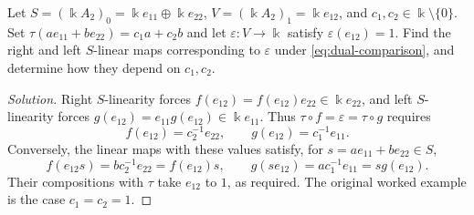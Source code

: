\begin{advanced}
\begin{exercise}\label{ex:dual-blocks}
Let $S=(\Bbbk A_2)_0=\Bbbk e_{11}\oplus\Bbbk e_{22}$, $V=(\Bbbk A_2)_1=\Bbbk e_{12}$, and $c_1,c_2\in\Bbbk\setminus\{0\}$.
Set $\tau(ae_{11}+be_{22})=c_1a+c_2b$ and let $\varepsilon:V\to\Bbbk$ satisfy $\varepsilon(e_{12})=1$.
Find the right and left $S$-linear maps corresponding to $\varepsilon$ under \eqref{eq:dual-comparison}, and determine how they depend on $c_1,c_2$.
\end{exercise}

\begin{hidden}
\begin{proof}[Solution]
Right $S$-linearity forces $f(e_{12})=f(e_{12})e_{22}\in\Bbbk e_{22}$, and left $S$-linearity forces $g(e_{12})=e_{11}g(e_{12})\in\Bbbk e_{11}$.
Thus $\tau\circ f=\varepsilon=\tau\circ g$ requires
\[
f(e_{12})=c_2^{-1}e_{22},\qquad g(e_{12})=c_1^{-1}e_{11}.
\]
Conversely, the linear maps with these values satisfy, for $s=ae_{11}+be_{22}\in S$,
\[
f(e_{12}s)=bc_2^{-1}e_{22}=f(e_{12})s,\qquad
g(se_{12})=ac_1^{-1}e_{11}=sg(e_{12}).
\]
Their compositions with $\tau$ take $e_{12}$ to $1$, as required.
The original worked example is the case $c_1=c_2=1$.
\end{proof}
\end{hidden}


\end{advanced}
